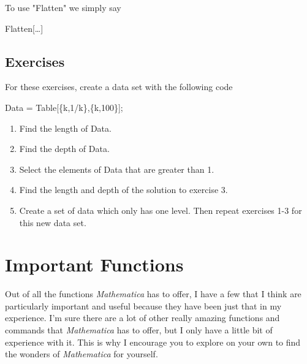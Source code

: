 \documentclass[11pt,letterpaper,twoside,titlepage]{report}
\newcommand{\Mathematica}{\textit{Mathematica} }
\begin{document}
				To use "Flatten" we simply say
					
				\begin{center} Flatten[\dots] \end{center}
				
		\chapter{Exercises}
		
			For these exercises, create a data set with the following code
			
			\begin{center}
			
				Data = Table[\{k,1/k\},\{k,100\}];
			
			\end{center}
		
			\begin{enumerate}
			
				\item %
				
					Find the length of Data.
					
				\item %
				
					Find the depth of Data.
					
				\item %
				
					Select the elements of Data that are greater than 1.
					
				\item %
				
					Find the length and depth of the solution to exercise 3.
					
				\item %
				
					Create a set of data which only has one level.  Then repeat exercises 1-3 for this new data set.
			
			\end{enumerate}
			
	\part{Important Functions}
	
		Out of all the functions \Mathematica has to offer, I have a few that I think are particularly important and useful because they have been just that in my experience.  I'm sure there are a lot of other really amazing functions and commands that \Mathematica has to offer, but I only have a little bit of experience with it.  This is why I encourage you to explore on your own to find the wonders of \Mathematica for yourself. \\
		
\end{document}
